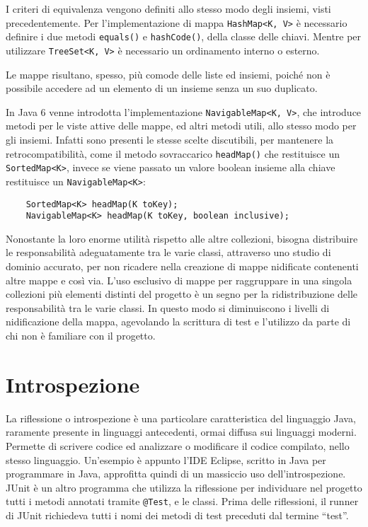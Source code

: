 \documentclass{article}
\numberwithin{equation}{subsection}
\begin{document}
I criteri di equivalenza vengono definiti allo stesso modo degli insiemi, visti precedentemente. 
Per l'implementazione di mappa \verb|HashMap<K, V>| è necessario definire i due metodi \verb|equals()| e \verb|hashCode()|, della classe delle chiavi. Mentre per 
utilizzare \verb|TreeSet<K, V>| è necessario un ordinamento interno o esterno. 

Le mappe risultano, spesso, più comode delle liste ed insiemi, poiché non è possibile accedere ad un elemento di un insieme senza un suo duplicato. 

In Java 6 venne introdotta l'implementazione \verb|NavigableMap<K, V>|, che introduce metodi per le viste attive delle mappe, ed altri metodi utili, allo stesso modo 
per gli insiemi. Infatti sono presenti le stesse scelte discutibili, per mantenere la retrocompatibilità, come il metodo sovraccarico \verb|headMap()| che restituisce 
un \verb|SortedMap<K>|, invece se viene passato un valore boolean insieme alla chiave restituisce un \verb|NavigableMap<K>|:
\begin{verbatim}
    SortedMap<K> headMap(K toKey);
    NavigableMap<K> headMap(K toKey, boolean inclusive);
\end{verbatim}

Nonostante la loro enorme utilità rispetto alle altre collezioni, bisogna distribuire le responsabilità adeguatamente tra le varie classi, attraverso uno studio di 
dominio accurato, per non ricadere nella creazione di mappe nidificate contenenti altre mappe e così via. L'uso esclusivo di mappe per raggruppare in una singola collezioni 
più elementi distinti del progetto è un segno per la ridistribuzione delle responsabilità tra le varie classi. In questo modo si diminuiscono i livelli di nidificazione 
della mappa, agevolando la scrittura di test e l'utilizzo da parte di chi non è familiare con il progetto. 

\clearpage

\section{Introspezione}

La riflessione o introspezione è una particolare caratteristica del linguaggio Java, raramente presente in linguaggi antecedenti, ormai diffusa sui linguaggi moderni. 
Permette di scrivere codice ed analizzare o modificare il codice compilato, nello stesso linguaggio. Un'esempio è appunto l'IDE Eclipse, scritto in Java per programmare in 
Java, approfitta quindi di un massiccio uso dell'introspezione. 
JUnit è un altro programma che utilizza la riflessione per individuare nel progetto tutti i metodi annotati tramite \verb|@Test|, e le classi. Prima delle 
riflessioni, il runner di JUnit richiedeva tutti i nomi dei metodi di test preceduti dal termine ``test''. 
\end{document}
